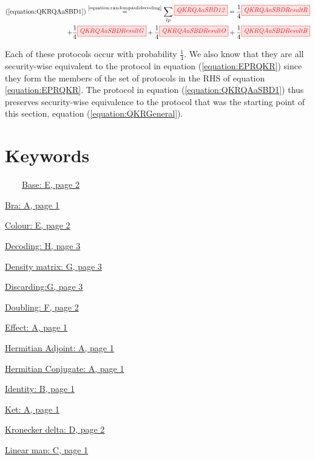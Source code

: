 \documentclass[]{article}
\newcommand{\equaltext}[1]{\ensuremath{\stackrel{\text{#1}}{=}}}
\begin{document}
\begin{equation}
	\label{equation:QKRQAaSBDResult}
	\begin{aligned}
	(\ref{equation:QKRQAaSBD1}) \equaltext{\ref{equation:randompaulidecoding}}
	\sum\limits_{lp}\tikzfig{QKRQAaSBD12} = \frac{1}{4}\tikzfig{QKRQAaSBDResultR} \\+
	\frac{1}{4}\tikzfig{QKRQAaSBDResultG} +
	\frac{1}{4}\tikzfig{QKRQAaSBDResultO} +
	\frac{1}{4}\tikzfig{QKRQAaSBDResultB}
	\end{aligned}
\end{equation}

Each of these protocols occur with probability $\frac{1}{4}$. We also know that they are all security-wise equivalent to the protocol in equation (\ref{equation:EPRQKR}) since they form the members of the set of protocols in the RHS of equation \ref{equation:EPRQKR}. The protocol in equation (\ref{equation:QKRQAaSBD1}) thus preserves security-wise equivalence to the protocol that was the starting point of this section, equation (\ref{equation:QKRGeneral}).



\appendix


\section{Keywords}
\label{Keywords}


~~~~\hyperref[coloursandbases]{Base: E, page 2}

\hyperref[braandket]{Bra: A, page 1}

\hyperref[coloursandbases]{Colour: E, page 2}

\hyperref[phasespiders]{Decoding: H, page 3}

\hyperref[discarding]{Density matrix: G, page 3}

\hyperref[discarding]{Discarding:G, page 3}

\hyperref[doubling]{Doubling: F, page 2}

\hyperref[braandket]{Effect: A, page 1}

\hyperref[braandket]{Hermitian Adjoint: A, page 1}

\hyperref[braandket]{Hermitian Conjugate: A, page 1}

\hyperref[identity]{Identity: B, page 1}

\hyperref[braandket]{Ket: A, page 1}

\hyperref[spiders]{Kronecker delta: D, page 2}

\hyperref[maps]{Linear map: C, page 1}
\end{document}

